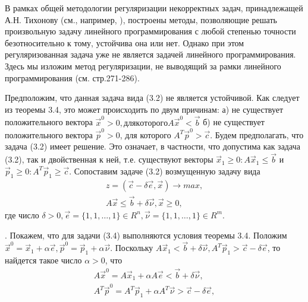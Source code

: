 В рамках общей методологии регуляризации некорректных задач, принадлежащей А.Н. Тихонову (см., например, \cite{literature_tihonov}),  построены методы, позволяющие решать произвольную задачу линейного программирования с любой степенью точности безотносительно к тому, устойчива она или нет. Однако при этом регуляризованная задача уже не является задачей линейного программирования. Здесь мы изложим метод регуляризации, не выводящий за рамки линейного программирования (см.\cite{literature_ashmanov_1981} стр.271-286).

Предположим, что данная задача вида (3.2) не является устойчивой. Как следует из теоремы 3.4, это может происходить по двум причинам: а) не существует положительного вектора $\overrightarrow{x}^0 > 0, для которого A\overrightarrow{x}^0 < \overrightarrow{b}$ б) не существует положительного вектора $\overrightarrow{p}^0 > 0$, для которого $A^T\overrightarrow{p}^0>\overrightarrow{c}$. Будем предполагать, что задача (3.2) имеет решение. Это означает, в частности, что допустима как задача (3.2), так и двойственная к ней, т.е. существуют векторы $\overrightarrow{x}_1 \geq 0 : A \overrightarrow{x}_1 \leq \overrightarrow{b}$ и $\overrightarrow{p}_1 \geq 0 : A^T \overrightarrow{p}_1 \geq \overrightarrow{c} $. Сопоставим задаче (3.2) возмущенную задачу вида
\begin{align}
z = (\overrightarrow{c} - \delta \overrightarrow{e}, \overrightarrow{x}) \rightarrow max, \\
A\overrightarrow{x} \leq \overrightarrow{b}+\delta\overrightarrow{\nu}, \overrightarrow{x} \geq 0,
\end{align}
где число $\delta>0, \overrightarrow{e} = \{ 1,1,\ldots,1\} \in R^n, \overrightarrow{\nu}=\{ 1,1,\ldots,1\}\in R^m$.

. Покажем, что для задачи (3.4) выполняются условия теоремы 3.4. Положим $\overrightarrow{x}^0 = \overrightarrow{x}_1 + \alpha\overrightarrow{e}, \overrightarrow{p}^0 = \overrightarrow{p}_1 + \alpha \overrightarrow{\nu}$. Поскольку $A\overrightarrow{x}_1 < \overrightarrow{b} + \delta\overrightarrow{\nu}, A^T\overrightarrow{p}_1 > \overrightarrow{c} - \delta \overrightarrow{e}$, то найдется такое число $\alpha > 0$, что
\begin{align*}
  A\overrightarrow{x}^0 = A\overrightarrow{x}_1 + \alpha A\overrightarrow{e} <\overrightarrow{b}+\delta\overrightarrow{\nu},\\
  A^T\overrightarrow{p}^0 = A^T\overrightarrow{p}_1 + \alpha A^T\overrightarrow{\nu} >\overrightarrow{c}-\delta\overrightarrow{e},
\end{align*}

